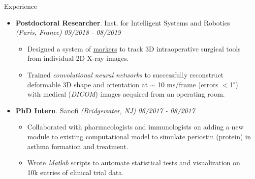 \documentclass{resume} %
\begin{document}
\begin{rSection}{Experience}
\begin{itemize}[leftmargin=0em]
			\item {\bf Postdoctoral Researcher}{. Inst. for Intelligent Systems and Robotics \textit{(Paris, France)}} \hfill {\em 09/2018 - 08/2019}\\
			\vspace{-5mm}
			\begin{itemize}
				\setlength\itemsep{-1.75em}
				\item  Designed a system of \href{https://tinyurl.com/yxk4jou4}{markers} to track 3D intraoperative surgical tools from individual 2D X-ray images.\\ 
				\item  Trained \textit{convolutional neural networks} to successfully reconstruct deformable 3D shape and orientation at $\sim$ 10 ms/frame (errors $<$1$^\circ$) with medical (\textit{DICOM}) images acquired from an operating room.
			\end{itemize}
			
			\item {\bf PhD Intern}{. Sanofi \textit{(Bridgewater, NJ)}} \hfill {\em 06/2017 - 08/2017}\\
			\vspace{-5mm}
			\begin{itemize}
				\setlength\itemsep{-1.75em}	
				\item Collaborated with pharmacologists and immunologists on adding a new module to existing computational model to simulate periostin (protein) in asthma formation and treatment.\\
				\item Wrote \textit{Matlab} scripts to automate statistical tests and visualization on 10k entries of clinical trial data.
			\end{itemize}
			

\end{itemize}
\end{rSection}
\end{document}
